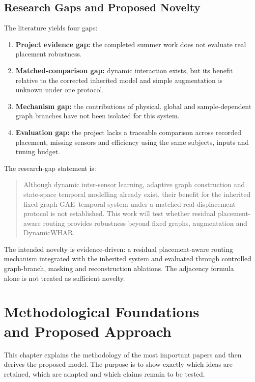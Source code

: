\documentclass[12pt,a4paper,twoside,openright]{report}
\begin{document}
\section{Research Gaps and Proposed Novelty}
The literature yields four gaps:
\begin{enumerate}
\item \textbf{Project evidence gap:} the completed summer work does not evaluate real placement robustness.
\item \textbf{Matched-comparison gap:} dynamic interaction exists, but its benefit relative to the corrected inherited model and simple augmentation is unknown under one protocol.
\item \textbf{Mechanism gap:} the contributions of physical, global and sample-dependent graph branches have not been isolated for this system.
\item \textbf{Evaluation gap:} the project lacks a traceable comparison across recorded placement, missing sensors and efficiency using the same subjects, inputs and tuning budget.
\end{enumerate}

The research-gap statement is:
\begin{quote}
Although dynamic inter-sensor learning, adaptive graph construction and state-space temporal modelling already exist, their benefit for the inherited fixed-graph GAE--temporal system under a matched real-displacement protocol is not established. This work will test whether residual placement-aware routing provides robustness beyond fixed graphs, augmentation and DynamicWHAR.
\end{quote}
\vspace{-5pt}

The intended novelty is evidence-driven: a residual placement-aware routing mechanism integrated with the inherited system and evaluated through controlled graph-branch, masking and reconstruction ablations. The adjacency formula alone is not treated as sufficient novelty.

\cleardoublepage
\chapter[Methodological Foundations and Proposed Approach]{Methodological Foundations\\and Proposed Approach}

This chapter explains the methodology of the most important papers and then derives the proposed model. The purpose is to show exactly which ideas are retained, which are adapted and which claims remain to be tested.
\end{document}
